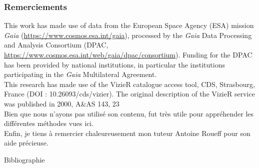 \documentclass[10pt,compress,hyperref={pdfpagemode=FullScreen,colorlinks=false}]{beamer}
\begin{document}
\begin{frame}
    \frametitle{Remerciements}

    This work has made use of data from the European Space Agency (ESA) mission
    {\itshape Gaia} (\url{https://www.cosmos.esa.int/gaia}), processed by the {\itshape Gaia}
    Data Processing and Analysis Consortium (DPAC,
    \url{https://www.cosmos.esa.int/web/gaia/dpac/consortium}). Funding for the DPAC
    has been provided by national institutions, in particular the institutions
    participating in the {\itshape Gaia} Multilateral Agreement.
    \\[8pt]
    This research has made use of the VizieR catalogue access tool, CDS,
    Strasbourg, France (DOI : 10.26093/cds/vizier). The original description 
    of the VizieR service was published in 2000, A\&AS 143, 23
    \\[8pt]
    Bien que nous n'ayons pas utilisé son contenu, \citet{main-source} fut très utile pour appréhender les différentes méthodes vues ici.
    \\[8pt]
    Enfin, je tiens à remercier chaleureusement mon tuteur Antoine Roueff pour son aide précieuse.
\end{frame}

\begin{frame}[allowframebreaks]{Bibliographie}
    \small %
    \nocite{*}
    
\end{frame}
\end{document}
